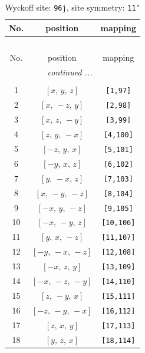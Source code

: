 \documentclass[fleqn,8pt]{jsarticle}
\begin{document}
\begin{longtable}{ccc}
\caption{Wyckoff site: {\tt 96j}, site symmetry: {\tt 11'}}
 \\
 \hline \hline
No. & position & mapping \\ \hline \endfirsthead

\multicolumn{2}{l}{\tablename\ \thetable{}} \\
 \hline \hline
No. & position & mapping \\ \hline \endhead

 \hline \hline
\multicolumn{2}{r}{\footnotesize\it continued ...} \\ \endfoot

 \hline \hline
\multicolumn{2}{r}{} \\ \endlastfoot

1 & $\left[ x,\, y,\, z \right]$ & {\tt [1,97]} \\ \hline
2 & $\left[ x,\, - z,\, y \right]$ & {\tt [2,98]} \\ \hline
3 & $\left[ x,\, z,\, - y \right]$ & {\tt [3,99]} \\ \hline
4 & $\left[ z,\, y,\, - x \right]$ & {\tt [4,100]} \\ \hline
5 & $\left[ - z,\, y,\, x \right]$ & {\tt [5,101]} \\ \hline
6 & $\left[ - y,\, x,\, z \right]$ & {\tt [6,102]} \\ \hline
7 & $\left[ y,\, - x,\, z \right]$ & {\tt [7,103]} \\ \hline
8 & $\left[ x,\, - y,\, - z \right]$ & {\tt [8,104]} \\ \hline
9 & $\left[ - x,\, y,\, - z \right]$ & {\tt [9,105]} \\ \hline
10 & $\left[ - x,\, - y,\, z \right]$ & {\tt [10,106]} \\ \hline
11 & $\left[ y,\, x,\, - z \right]$ & {\tt [11,107]} \\ \hline
12 & $\left[ - y,\, - x,\, - z \right]$ & {\tt [12,108]} \\ \hline
13 & $\left[ - x,\, z,\, y \right]$ & {\tt [13,109]} \\ \hline
14 & $\left[ - x,\, - z,\, - y \right]$ & {\tt [14,110]} \\ \hline
15 & $\left[ z,\, - y,\, x \right]$ & {\tt [15,111]} \\ \hline
16 & $\left[ - z,\, - y,\, - x \right]$ & {\tt [16,112]} \\ \hline
17 & $\left[ z,\, x,\, y \right]$ & {\tt [17,113]} \\ \hline
18 & $\left[ y,\, z,\, x \right]$ & {\tt [18,114]} \\ \hline

\end{longtable}
\end{document}
